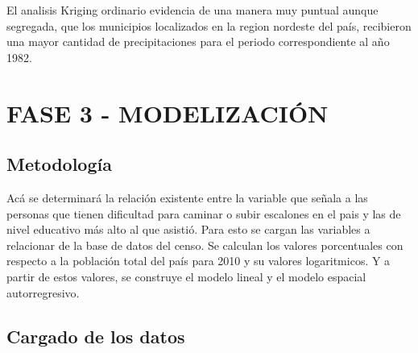 \documentclass[11pt,]{article}
\begin{document}
El analisis Kriging ordinario evidencia de una manera muy puntual aunque
segregada, que los municipios localizados en la region nordeste del
país, recibieron una mayor cantidad de precipitaciones para el periodo
correspondiente al año 1982.

\section{FASE 3 - MODELIZACIÓN}\label{fase-3---modelizaciuxf3n}

\subsection{Metodología}\label{metodologuxeda-2}

Acá se determinará la relación existente entre la variable que señala a
las personas que tienen dificultad para caminar o subir escalones en el
pais y las de nivel educativo más alto al que asistió. Para esto se
cargan las variables a relacionar de la base de datos del censo. Se
calculan los valores porcentuales con respecto a la población total del
país para 2010 y su valores logaritmicos. Y a partir de estos valores,
se construye el modelo lineal y el modelo espacial autorregresivo.

\subsection{Cargado de los datos}\label{cargado-de-los-datos}
\end{document}

